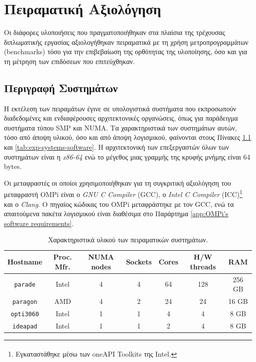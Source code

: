 \chapter{Πειραματική Αξιολόγηση}
\label{ch:Experimental Evaluation}
Οι διάφορες υλοποιήσεις που πραγματοποιήθηκαν στα πλαίσια της τρέχουσας διπλωματικής εργασίας αξιολογήθηκαν πειραματικά με τη χρήση μετροπρογραμμάτων (benchmarks) τόσο για την επιβεβαίωση της ορθότητας της υλοποίησης, όσο και για τη μέτρηση των επιδόσεων που επιτεύχθηκαν.


\section{Περιγραφή Συστημάτων}
\label{sec:Systems Description}
Η εκτέλεση των πειραμάτων έγινε σε υπολογιστικά συστήματα που εκπροσωπούν διαδεδομένες και ενδιαφέρουσες αρχιτεκτονικές οργανώσεις, όπως για παράδειγμα συστήματα τύπου SMP και NUMA. Τα χαρακτηριστικά των συστημάτων αυτών, τόσο από άποψη υλικού, όσο και από άποψη λογισμικού, φαίνονται στους Πίνακες \ref{tab:exp-systems-hardware} και \ref{tab:exp-systems-software}. Η αρχιτεκτονική των επεξεργαστών όλων των συστημάτων είναι η \textit{x86-64} ενώ το μέγεθος μιας γραμμής της κρυφής μνήμης είναι 64 bytes.

Οι μεταφραστές οι οποίοι χρησιμοποιήθηκαν για τη συγκριτική αξιολόγηση του μεταφραστή OMPi είναι ο \textit{GNU C Compiler} (GCC), ο \textit{Intel C Compiler} (ICC)\footnote{Εγκαταστάθηκε μέσω των oneAPI Toolkits της Intel\textsuperscript{\textregistered}.} και ο \textit{Clang}. Ο πηγαίος κώδικας του OMPi μεταφράστηκε με τον GCC, ενώ τα απαιτούμενα πακέτα λογισμικού είναι διαθέσιμα στο Παράρτημα \ref{app:OMPi's software requirements}.

\begin{table}
	\centering
		\begin{tabular}{|c||c|c|c|c|c|c|}
		\hline
		Hostname & Proc. Mfr. & NUMA nodes & Sockets & Cores & H/W threads & RAM \\
		\hline \hline
		\texttt{parade} & Intel & 4 & 4 & 64 & 128 & 256 GB \\
		\hline
		\texttt{paragon} & AMD  & 4 & 2 & 24 & 24 & 16 GB \\
		\hline
		\texttt{opti3060} & Intel & 1 & 1 & 4 & 4 & 8 GB \\
		\hline
		\texttt{ideapad} & Intel & 1 & 1 & 2 & 4 & 8 GB \\
		\hline
		\end{tabular}
		\caption{Χαρακτηριστικά υλικού των πειραματικών συστημάτων.}
		\label{tab:exp-systems-hardware}
\end{table}

